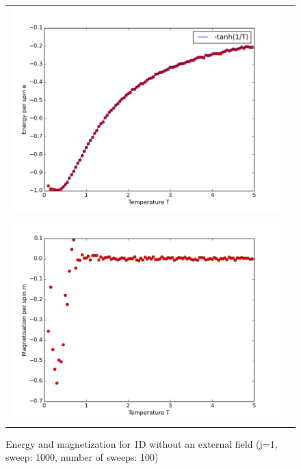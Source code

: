 \documentclass[12pt,a4paper,titlepage]{article}
\begin{document}
\begin{figure}

\centering
\begin{tabular}{cc}
\includegraphics[width=13cm]{Plots/E_Mean_1}\\
\includegraphics[width=13cm]{Plots/Mag_Mean_1} \\
\end{tabular} 
\caption{Energy and magnetization for 1D without an external field (j=1, sweep: 1000, number of sweeps: 100)}
\label{fig:1denmag}
\end{figure}
\end{document}
